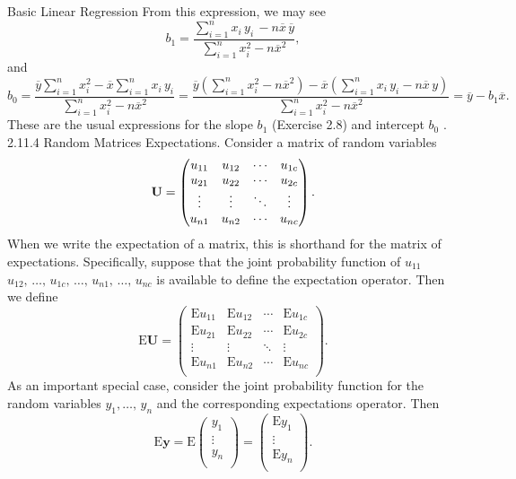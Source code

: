 \documentclass[11pt]{article}
\begin{document}
 Basic Linear Regression
From this expression, we may see
\[
b_{1}=\frac{\sum_{i=1}^{n} x_{i} \, y_{i} \,-n \overline{{x}} \, \overline{{y}}} {\sum_{i=1}^{n} x_{i}^{2}-n \overline{{x}}^{2}} ,
\]
and
\[
b_{0}=\frac{\overline{{y}} \sum_{i=1}^{n} x_{i}^{2}-\overline{{x}} \sum_{i=1}^{n} x_{i} \, y_{i}} {\sum_{i=1}^{n} x_{i}^{2}-n \overline{{x}}^{2}}=\frac{\overline{{y}} \left( \sum_{i=1}^{n} x_{i}^{2}-n \overline{{x}}^{2} \right)-\overline{{x}} \left( \sum_{i=1}^{n} x_{i} \, y_{i}-n \overline{{x}} \, y \right)} {\sum_{i=1}^{n} x_{i}^{2}-n \overline{{x}}^{2}}=\overline{{y}}-b_{1} \overline{{x}} .
\]
These are the usual expressions for the slope \(b_{1}\) (Exercise 2.8) and intercept \(b_{0}\) .
 2.11.4 Random Matrices
Expectations. Consider a matrix of random variables
\[
{\bf U}=\left( \begin{matrix} {u_{1 1}} & {u_{1 2}} & {\cdots} & {u_{1 c}} \\ {u_{2 1}} & {u_{2 2}} & {\cdots} & {u_{2 c}} \\ {\vdots} & {\vdots} & {\ddots} & {\vdots} \\ {u_{n 1}} & {u_{n 2}} & {\cdots} & {u_{n c}} \\ \end{matrix} \right) .
\]
When we write the expectation of a matrix, this is shorthand for the matrix
 of expectations. Specifically, suppose that the joint probability function of \(u_{1 1}\)
\(u_{1 2} , \, \ldots, \, u_{1 c} , \, \ldots, \, u_{n 1} , \, \ldots, \, u_{n c}\) is available to define the expectation operator.
Then we define
\[
\textrm{E} \mathbf{U}=\left( \begin{matrix} {\mathrm{E} u_{1 1}} & {\mathrm{E} u_{1 2}} & {\cdots} & {\mathrm{E} u_{1 c}} \\ {\mathrm{E} u_{2 1}} & {\mathrm{E} u_{2 2}} & {\cdots} & {\mathrm{E} u_{2 c}} \\ {\vdots} & {\vdots} & {\ddots} & {\vdots} \\ {\mathrm{E} u_{n 1}} & {\mathrm{E} u_{n 2}} & {\cdots} & {\mathrm{E} u_{n c}} \\ \end{matrix} \right) .
\]
As an important special case, consider the joint probability function for the
 random variables \(y_{1} , \dots, \, y_{n}\) and the corresponding expectations operator. Then
\[
\textrm{E} \mathbf{y}=\mathrm{E} \left( \begin{matrix} {y_{1}} \\ {\vdots} \\ {y_{n}} \\ \end{matrix} \right)=\left( \begin{matrix} {\textrm{E} y_{1}} \\ {\vdots} \\ {\textrm{E} y_{n}} \\ \end{matrix} \right) .
\]
\end{document}
